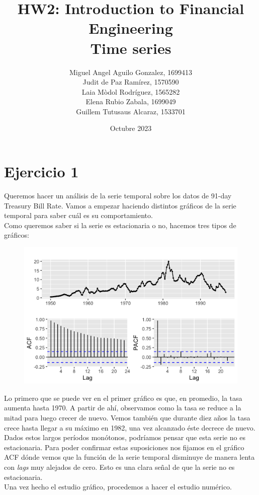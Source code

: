\documentclass[a4paper,]{article}
\title{\textbf{HW2: Introduction to Financial Engineering} \\ Time series}
\author{Miguel Angel Aguilo Gonzalez, 1699413 \\ Judit de Paz Ramírez, 1570590 \\ Laia Mòdol Rodríguez, 1565282 \\ Elena Rubio Zabala, 1699049 \\ Guillem Tutusaus Alcaraz, 1533701 }
\date{Octubre 2023}
\begin{document}
\maketitle
\newpage

\section*{Ejercicio 1}
Queremos hacer un análisis de la serie temporal sobre los datos de 91-day Treasury Bill Rate. Vamos a empezar haciendo distintos gráficos de la serie temporal para saber cuál es su comportamiento. \\

Como queremos saber si la serie es estacionaria o no, hacemos tres tipos de gráficos:
\begin{figure}[H]
    \centering
    \includegraphics[width=0.5\linewidth]{1a.png}
\end{figure}
Lo primero que se puede ver en el primer gráfico es que, en promedio, la tasa aumenta hasta 1970. A partir de ahí, observamos como la tasa se reduce a la mitad para luego crecer de nuevo. Vemos también que durante diez años la tasa crece hasta llegar a su máximo en 1982, una vez alcanzado éste decrece de nuevo.\\

Dados estos largos períodos monótonos, podríamos pensar que esta serie no es estacionaria. Para poder confirmar estas suposiciones nos fijamos en el gráfico ACF dónde vemos que la función de la serie temporal disminuye de manera lenta con \textit{lags} muy alejados de cero. Esto es una clara señal de que la serie no es estacionaria. \\

Una vez hecho el estudio gráfico, procedemos a hacer el estudio numérico. \\
\end{document}
